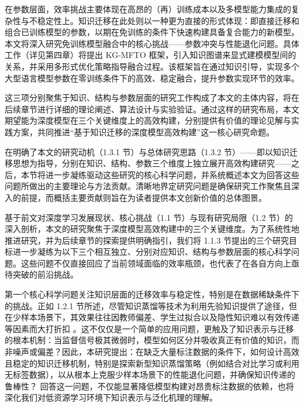 \documentclass[../main.tex]{subfiles}
\begin{document}
在参数层面，效率挑战主要体现在高昂的（再）训练成本以及多模型能力集成的复杂性与不稳定性上。知识迁移在此处则以一种更为直接的形式体现：即直接迁移和组合已训练模型的参数，以期在免训练的条件下快速构建具备复合能力的新模型。本文将深入研究免训练模型融合中的核心挑战——参数冲突与性能退化问题。具体工作（详见第四章）将提出 KG-MFTO 框架，引入知识图谱来显式建模模型间的关系，并采用多形式优化策略指导融合过程。该框架旨在通过知识引导，实现多个大型语言模型参数在零训练条件下的高效、稳定融合，提升参数实现环节的效率。

这三项分别聚焦于知识、结构与参数层面的研究工作构成了本文的主体内容，将在后续章节进行详细的理论阐述、算法设计与实验验证。通过这样的研究布局，本文期望能为深度模型在三个关键维度上的高效构建，分别提供有价值的理论见解与实践方案，共同推进“基于知识迁移的深度模型高效构建”这一核心研究命题。

\label{sec:research-questions-and-contributions}

在明确了本文的研究动机（1.3.1 节）与总体研究思路（1.3.2 节）——即以知识迁移思想为指导，分别在知识、结构、参数三个维度上独立展开高效构建研究——之后，本节将进一步凝练驱动这些研究的核心科学问题，并系统概述本文为回答这些问题所做出的主要理论与方法贡献。清晰地界定研究问题是确保研究工作聚焦且深入的前提，而概括主要贡献则旨在为读者提供本文创新价值的总体图景。


基于前文对深度学习发展现状、核心挑战（1.1 节）与现有研究局限（1.2 节）的深入剖析，本文的研究聚焦于深度模型高效构建中的三个关键维度。为了系统性地推进研究，并为后续章节的探索提供明确指引，我们将 1.1.3 节提出的三个研究目标进一步凝练为以下三个相互独立、分别对应知识、结构与参数层面的核心科学问题。这些问题不仅直接回应了当前领域面临的效率瓶颈，也代表了在各自方向上亟待突破的前沿挑战。

第一个核心科学问题关注知识层面的迁移效率与稳定性，特别是在数据稀缺条件下的挑战。正如 1.2.1 节所述，尽管知识蒸馏等技术为利用先验知识提供了途径，但在少样本场景下，其效果往往因教师偏差、学生过拟合以及隐性知识难以有效传递等因素而大打折扣 。这不仅仅是一个简单的应用问题，更触及了知识表示与迁移的根本机制：当监督信号极其微弱时，模型如何区分并吸收真正有价值的知识，而非噪声或偏差？因此，本研究提出：在缺乏大量标注数据的条件下，如何设计高效且稳定的知识迁移机制，特别是探索新型知识蒸馏策略（例如结合对比学习或利用无标签数据），以从根本上克服少样本场景下的性能退化问题，并确保知识传递的鲁棒性？ 回答这一问题，不仅能显著降低模型构建对昂贵标注数据的依赖，也将深化我们对低资源学习环境下知识表示与泛化机理的理解。
\end{document}
